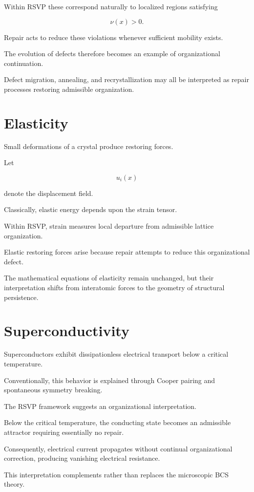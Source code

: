\documentclass[11pt,oneside]{book}
\numberwithin{equation}{chapter}
\theoremstyle{definition}
\theoremstyle{plain}
\begin{document}
Within RSVP these correspond naturally to localized regions satisfying

\[
\nu(x)>0.
\]

Repair acts to reduce these violations whenever sufficient mobility exists.

The evolution of defects therefore becomes an example of organizational
continuation.

Defect migration, annealing, and recrystallization may all be interpreted as
repair processes restoring admissible organization.

\section{Elasticity}

Small deformations of a crystal produce restoring forces.

Let

\[
u_i(x)
\]

denote the displacement field.

Classically, elastic energy depends upon the strain tensor.

Within RSVP, strain measures local departure from admissible lattice
organization.

Elastic restoring forces arise because repair attempts to reduce this
organizational defect.

The mathematical equations of elasticity remain unchanged, but their
interpretation shifts from interatomic forces to the geometry of structural
persistence.

\section{Superconductivity}

Superconductors exhibit dissipationless electrical transport below a
critical temperature.

Conventionally, this behavior is explained through Cooper pairing and
spontaneous symmetry breaking.

The RSVP framework suggests an organizational interpretation.

Below the critical temperature, the conducting state becomes an admissible
attractor requiring essentially no repair.

Consequently, electrical current propagates without continual organizational
correction, producing vanishing electrical resistance.

This interpretation complements rather than replaces the microscopic BCS
theory.
\end{document}
